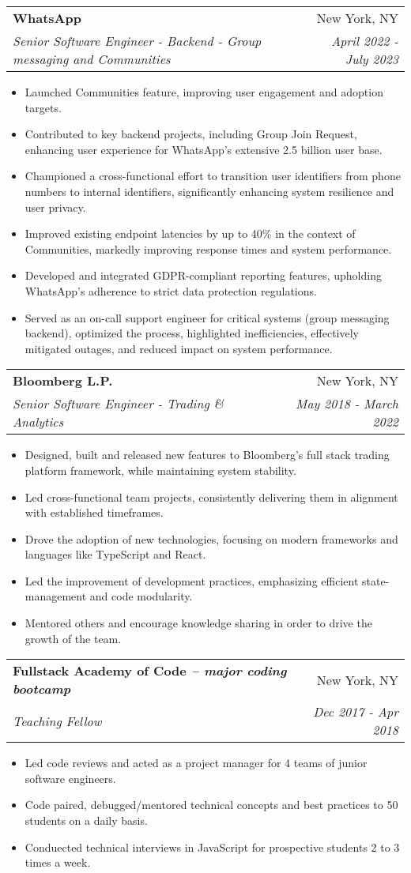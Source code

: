 \documentclass[letterpaper,10pt]{article}
\makeatletter
\newcommand{\resumeItemSimple}[1]{
  \item\small{
    {#1}{\vspace{-2pt}}
  }
}
\newcommand{\resumeSubheading}[4]{
  \vspace{-1pt}\item
    \begin{tabular*}{0.97\textwidth}{l@{\extracolsep{\fill}}r}
      \textbf{#1} & #2 \\
      \textit{\small#3} & \textit{\small #4} \\
    \end{tabular*}\vspace{-5pt}
}
\newcommand{\resumeItemListStart}{\begin{itemize}}
\newcommand{\resumeItemListEnd}{\end{itemize}\vspace{-5pt}}
\makeatother
\begin{document}
    \resumeSubheading
      {WhatsApp}{New York, NY}
      {Senior Software Engineer - Backend - Group messaging and Communities}{April 2022 - July 2023}
      \resumeItemListStart
        \resumeItemSimple{Launched Communities feature, improving user engagement and adoption targets.}
        \resumeItemSimple{Contributed to key backend projects, including Group Join Request, enhancing user experience for WhatsApp's extensive 2.5 billion user base.}
        \resumeItemSimple{Championed a cross-functional effort to transition user identifiers from phone numbers to internal identifiers, significantly enhancing system resilience and user privacy.}
        \resumeItemSimple{Improved existing endpoint latencies by up to 40\% in the context of Communities, markedly improving response times and system performance.}
        \resumeItemSimple{Developed and integrated GDPR-compliant reporting features, upholding WhatsApp's adherence to strict data protection regulations.}
        \resumeItemSimple{Served as an on-call support engineer for critical systems (group messaging backend), optimized the process, highlighted inefficiencies, effectively mitigated outages, and reduced impact on system performance.}
      \resumeItemListEnd

    \resumeSubheading
      {Bloomberg L.P.}{New York, NY}
      {Senior Software Engineer - Trading \& Analytics}{May 2018 - March 2022}
      \resumeItemListStart
        \resumeItemSimple{Designed, built and released new features to Bloomberg's full stack trading platform framework, while maintaining system stability.}
        \resumeItemSimple{Led cross-functional team projects, consistently delivering them in alignment with established timeframes.}
        \resumeItemSimple{Drove the adoption of new technologies, focusing on modern frameworks and languages like TypeScript and React.}
        \resumeItemSimple{Led the improvement of development practices, emphasizing efficient state-management and code modularity.}
        \resumeItemSimple{Mentored others and encourage knowledge sharing in order to drive the growth of the team.}
      \resumeItemListEnd

    \resumeSubheading
      {Fullstack Academy of Code \normalfont\textit{-- major coding bootcamp}}{New York, NY}
      {Teaching Fellow}{Dec 2017 - Apr 2018}
      \resumeItemListStart
        \resumeItemSimple{Led code reviews and acted as a project manager for 4 teams of junior software engineers.}
        \resumeItemSimple{Code paired, debugged/mentored technical concepts and best practices to 50 students on a daily basis.}
        \resumeItemSimple{Conduected technical interviews in JavaScript for prospective students 2 to 3 times a week.}
      \resumeItemListEnd
\end{document}

